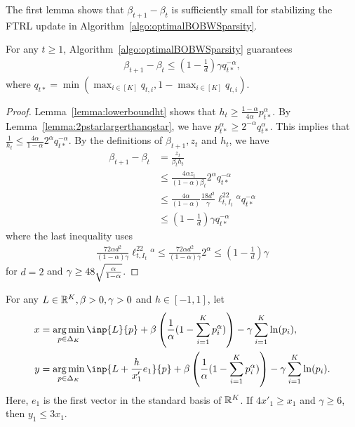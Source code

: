 The first lemma shows that $\beta_{t+1} - \beta_t$ is sufficiently small for stabilizing the FTRL update in Algorithm~\ref{algo:optimalBOBWSparsity}.
\begin{lemma}
    For any $t \geq 1$, Algorithm~\ref{algo:optimalBOBWSparsity} guarantees
    \begin{align}
        \beta_{t+1} - \beta_t \leq (1 - \frac{1}{d})\gamma q_{t*}^{-\alpha},
    \end{align}
    where $q_{t*} = \min(\max_{i \in [K]}q_{t,i}, 1 - \max_{i \in [K]}q_{t,i})$.
    \label{lemma:betatplus1isgood}
\end{lemma}
\begin{proof}
    Lemma~\ref{lemma:lowerboundht} shows that $h_t \geq \frac{1-\alpha}{4\alpha}p_{t*}^{\alpha}$. By Lemma~\ref{lemma:2pstarlargerthanqstar}, we have $p_{t*}^{\alpha} \geq 2^{-\alpha}q_{t*}^\alpha$. This implies that 
    {$\frac{1}{h_t} \leq \frac{4\alpha}{1-\alpha}2^{\alpha}q_{t*}^{-\alpha}$}.
    By the definitions of $\beta_{t+1}, z_t$ and $h_t$, we have 
    \begin{align*}
        \beta_{t+1} - \beta_t &= \frac{z_t}{\beta_t h_t} \\
        &\leq \frac{4\alpha z_t}{(1-\alpha)\beta_t}2^{\alpha}q_{t*}^{-\alpha} \\
        &\leq \frac{4\alpha}{(1-\alpha)} \frac{18d^2}{\gamma}\ell_{t,I_t}^22^{\alpha}q_{t*}^{-\alpha} \\
        &\leq (1-\frac{1}{d})\gamma q_{t*}^{-\alpha}
    \end{align*}
    where the last inequality uses
    \begin{align}
        \frac{72\alpha d^2}{(1-\alpha)\gamma}\ell_{t,I_t}^22^{\alpha} \leq \frac{72\alpha d^2}{(1-\alpha)\gamma}2^{\alpha} \leq (1-\frac{1}{d})\gamma
    \end{align}
    for $d = 2$ and $\gamma \geq 48\sqrt{\frac{\alpha}{1-\alpha}}$.
\end{proof}
\begin{lemma}
    For any $L \in \mathbb{R}^K, \beta > 0, \gamma > 0$ and $h \in [-1, 1]$, let 
    \begin{align*}
        x &= \argmin_{p \in \Delta_K}\inp{L}{p} + \beta\left(\frac{1}{\alpha}(1-\sum_{i=1}^K p_i^\alpha)\right) - \gamma\sum_{i=1}^K \ln(p_i), \\
        y &= \argmin_{p \in \Delta_K}\inp{L + \frac{h}{x'_1}e_1}{p} + \beta\left(\frac{1}{\alpha}(1-\sum_{i=1}^K p_i^\alpha)\right) - \gamma\sum_{i=1}^K \ln(p_i).
    \end{align*}
    Here, $e_1$ is the first vector in the standard basis of $\mathbb{R}^K$. If $4x'_1 \geq x_1$ and $\gamma \geq 6$, then $y_1 \leq 3x_1$.
    \label{lemma:stableSameBetaDiffLoss}
\end{lemma}
